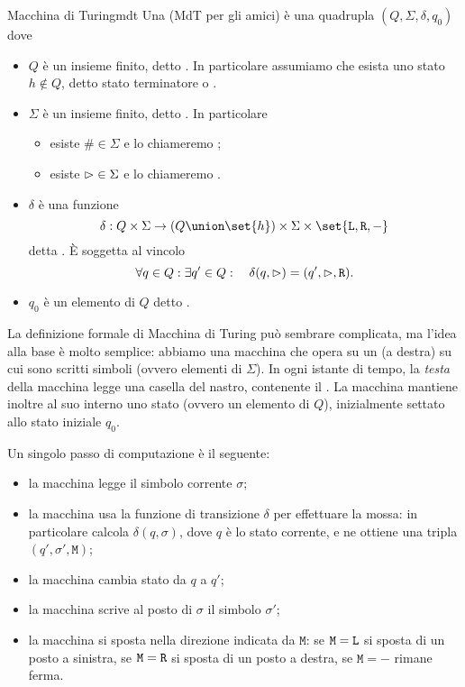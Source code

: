 \begin{definition}{Macchina di Turing}{mdt}
    Una  (MdT per gli amici) è una quadrupla $(Q, \Sigma, \delta, q_0)$ dove
    \begin{itemize}
        \item $Q$ è un insieme finito, detto . In particolare assumiamo che esista uno stato $h \notin Q$, detto stato terminatore o .
        \item $\Sigma$ è un insieme finito, detto . In particolare \begin{itemize}
            \item esiste $\# \in \Sigma$ e lo chiameremo ;
            \item esiste ${\vartriangleright} \in \Sigma$ e lo chiameremo .
        \end{itemize}
        \item $\delta$ è una funzione \[
            \delta : Q \times \Sigma \to (Q \union \set{h}) \times \Sigma \times \set{\Left, \Right, -}
        \] detta . È soggetta al vincolo \[
            \forall q \in Q: \exists q' \in Q : \quad \delta(q, {\vartriangleright}) = (q', {\vartriangleright}, \texttt{R}).
        \]
        \item $q_0$ è un elemento di $Q$ detto .
    \end{itemize}
\end{definition}

La definizione formale di Macchina di Turing può sembrare complicata, ma l'idea alla base è molto semplice: 
abbiamo una macchina che opera su un  (a destra) su cui sono scritti simboli (ovvero elementi di $\Sigma$).
In ogni istante di tempo, la \emph{testa} della macchina legge una casella del nastro, contenente il . 
La macchina mantiene inoltre al suo interno uno stato (ovvero un elemento di $Q$), inizialmente settato allo stato iniziale $q_0$.

Un singolo passo di computazione è il seguente: \begin{itemize}
    \item la macchina legge il simbolo corrente $\sigma$;
    \item la macchina usa la funzione di transizione $\delta$ per effettuare la mossa: in particolare calcola $\delta(q, \sigma)$, dove $q$ è lo stato corrente, e ne ottiene una tripla $(q', \sigma', \texttt{M})$;
    \item la macchina cambia stato da $q$ a $q'$;
    \item la macchina scrive al posto di $\sigma$ il simbolo $\sigma'$;
    \item la macchina si sposta nella direzione indicata da $\texttt{M}$: se $\texttt{M} = \texttt{L}$ si sposta di un posto a sinistra, se $\texttt{M} = \texttt{R}$ si sposta di un posto a destra, se $\texttt{M} = -$ rimane ferma.           
\end{itemize}

